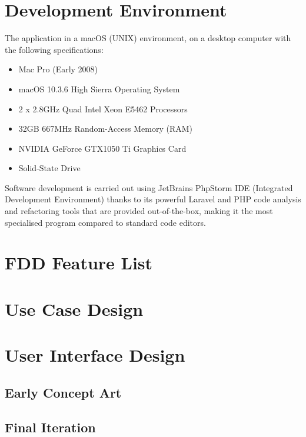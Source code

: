\section{Development Environment}
The application in a macOS (UNIX) environment, on a desktop computer with the following specifications:

\begin{itemize}
    \item Mac Pro (Early 2008)
    \item macOS 10.3.6 High Sierra Operating System
    \item 2 x 2.8GHz Quad Intel Xeon E5462 Processors
    \item 32GB 667MHz Random-Access Memory (RAM)
    \item NVIDIA GeForce GTX1050 Ti Graphics Card
    \item Solid-State Drive
\end{itemize}

Software development is carried out using JetBrains PhpStorm IDE (Integrated Development Environment) thanks to its powerful Laravel and PHP code analysis and refactoring tools that are provided out-of-the-box, making it the most specialised program compared to standard code editors. \cite{Jetbrains1}

\section{FDD Feature List}

\section{Use Case Design}

\section{User Interface Design}

\subsection{Early Concept Art}

\subsection{Final Iteration}